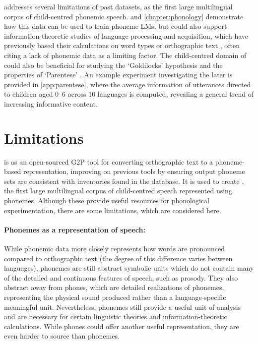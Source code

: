 \ipachildes addresses several limitations of past datasets, as the first large multilingual corpus of child-centred phonemic speech.  and \cref{chapter:phonology} demonstrate how this data can be used to train phoneme LMs, but \ipachildes could also support information-theoretic studies of language processing and acquisition, which have previously based their calculations on word types \citep{piantadosi2011word, dautriche2017words, pimentel2020phonotactic} or orthographic text \citep{mahowald2013info, dautriche2017wordform, futrell2020lossy}, often citing a lack of phonemic data as a limiting factor. The child-centred domain of \ipachildes could also be beneficial for studying the `Goldilocks' hypothesis \citep{kidd2014goldilocks} and the properties of `Parentese' \citep{ramirez2017look}. An example experiment investigating the later is provided in \cref{app:parentese}, where the average information of utterances directed to children aged 0--6 across 10 languages is computed, revealing a general trend of increasing informative content.

\section{Limitations}\label{sec:13-limitations}

\gpp is as an open-sourced G2P tool for converting orthographic text to a phoneme-based representation, improving on previous tools by ensuring output phoneme sets are consistent with inventories found in the \phoible database. It is used to create \ipachildes, the first large multilingual corpus of child-centred speech represented using phonemes. Although these provide useful resources for phonological experimentation, there are some limitations, which are considered here.

\paragraph{Phonemes as a representation of speech:} While phonemic data more closely represents how words are pronounced compared to orthographic text (the degree of this difference varies between languages), phonemes are still abstract symbolic units which do not contain many of the detailed and continuous features of speech, such as prosody. They also abstract away from phones, which are detailed realizations of phonemes, representing the physical sound produced rather than a language-specific meaningful unit. Nevertheless, phonemes still provide a useful unit of analysis and are necessary for certain linguistic theories and information-theoretic calculations. While phones could offer another useful representation, they are even harder to source than phonemes.

